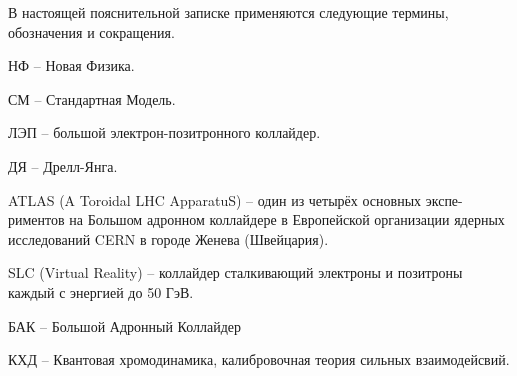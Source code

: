В настоящей пояснительной записке применяются следующие термины, обозначения и сокращения.

НФ -- Новая Физика.

СМ -- Стандартная Модель.

ЛЭП -- большой электрон-позитронного коллайдер.

ДЯ -- Дрелл-Янга.

ATLAS (A Toroidal LHC ApparatuS) -- один из четырёх основных экспе-риментов на Большом адронном коллайдере в Европейской организации ядерных исследований CERN в городе Женева (Швейцария).

SLC (Virtual Reality) -- коллайдер сталкивающий электроны и позитроны каждый с энергией до 50 ГэВ.

БАК -- Большой Адронный Коллайдер

КХД -- Квантовая хромодинамика, калибровочная теория сильных взаимодейсвий.